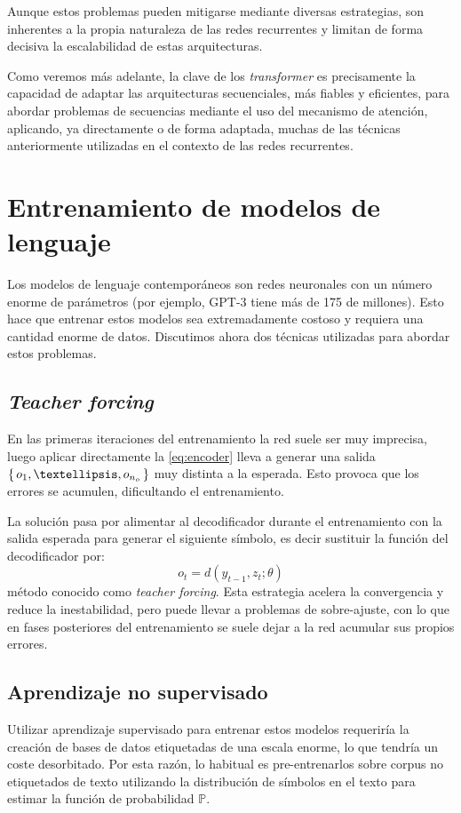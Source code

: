 Aunque estos problemas pueden mitigarse mediante diversas estrategias, son inherentes a la propia naturaleza de las redes recurrentes y limitan de forma decisiva la escalabilidad de estas arquitecturas. 

Como veremos más adelante, la clave de los \textit{transformer} es precisamente la capacidad de adaptar las arquitecturas secuenciales, más fiables y eficientes, para abordar problemas de secuencias mediante el uso del mecanismo de atención, aplicando, ya directamente o de forma adaptada, muchas de las técnicas anteriormente utilizadas en el contexto de las redes recurrentes. 

\section{Entrenamiento de modelos de lenguaje}
Los modelos de lenguaje contemporáneos son redes neuronales con un número enorme de parámetros (por ejemplo, GPT-3 tiene más de 175 de millones). Esto hace que entrenar estos modelos sea extremadamente costoso y requiera una cantidad enorme de datos. Discutimos ahora dos técnicas utilizadas para abordar estos problemas. 

\subsection{\textit{Teacher forcing}}
En las primeras iteraciones del entrenamiento la red suele ser muy imprecisa, luego aplicar directamente la \cref{eq:encoder} lleva a generar una salida \( \Set{ o_{1}, …, o_{n_o} } \) muy distinta a la esperada. Esto provoca que los errores se acumulen, dificultando el entrenamiento. 

La solución pasa por alimentar al decodificador durante el entrenamiento con la salida esperada para generar el siguiente símbolo, es decir sustituir la función del decodificador por:
\[
    o_{t} = d(y_{t-1}, z_{t}; \theta)
\]
método conocido como \textit{teacher forcing}. Esta estrategia acelera la convergencia y reduce la inestabilidad, pero puede llevar a problemas de sobre-ajuste, con lo que en fases posteriores del entrenamiento se suele dejar a la red acumular sus propios errores.

\subsection{Aprendizaje no supervisado}
Utilizar aprendizaje supervisado para entrenar estos modelos requeriría la creación de bases de datos etiquetadas de una escala enorme, lo que tendría un coste desorbitado. Por esta razón, lo habitual es pre-entrenarlos sobre corpus no etiquetados de texto utilizando la distribución de símbolos en el texto para estimar la función de probabilidad \( \mathbb{P} \). 

